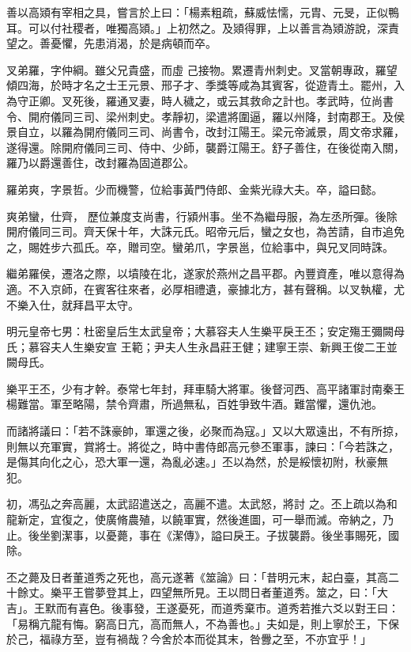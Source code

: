\begin{pinyinscope}
 善以高熲有宰相之具，嘗言於上曰：「楊素粗疏，蘇威怯懦，元胄、元旻，正似鴨耳。可以付社稷者，唯獨高熲。」上初然之。及熲得罪，上以善言為熲游說，深責望之。善憂懼，先患消渴，於是病頓而卒。



 叉弟羅，字仲綱。雖父兄貴盛，而虛
 己接物。累遷青州刺史。叉當朝專政，羅望傾四海，於時才名之士王元景、邢子才、季獎等咸為其賓客，從遊青土。罷州，入為守正卿。叉死後，羅通叉妻，時人穢之，或云其救命之計也。孝武時，位尚書令、開府儀同三司、梁州刺史。孝靜初，梁遣將圍逼，羅以州降，封南郡王。及侯景自立，以羅為開府儀同三司、尚書令，改封江陽王。梁元帝滅景，周文帝求羅，遂得還。除開府儀同三司、侍中、少師，襲爵江陽王。舒子善住，在後從南入關，羅乃以爵還善住，改封羅為固道郡公。



 羅弟爽，字景哲。少而機警，位給事黃門侍郎、金紫光祿大夫。卒，謚曰懿。



 爽弟蠻，仕齊，
 歷位兼度支尚書，行潁州事。坐不為繼母服，為左丞所彈。後除開府儀同三司。齊天保十年，大誅元氏。昭帝元后，蠻之女也，為苦請，自市追免之，賜姓步六孤氏。卒，贈司空。蠻弟爪，字景邕，位給事中，與兄叉同時誅。



 繼弟羅侯，遷洛之際，以墳陵在北，遂家於燕州之昌平郡。內豐資產，唯以意得為適。不入京師，在賓客往來者，必厚相禮遺，豪據北方，甚有聲稱。以叉執權，尤不樂入仕，就拜昌平太守。



 明元皇帝七男：杜密皇后生太武皇帝；大慕容夫人生樂平戾王丕；安定殤王彌闕母氏；慕容夫人生樂安宣
 王範；尹夫人生永昌莊王健；建寧王崇、新興王俊二王並闕母氏。



 樂平王丕，少有才幹。泰常七年封，拜車騎大將軍。後督河西、高平諸軍討南秦王楊難當。軍至略陽，禁令齊肅，所過無私，百姓爭致牛酒。難當懼，還仇池。



 而諸將議曰：「若不誅豪帥，軍還之後，必聚而為寇。」又以大眾遠出，不有所掠，則無以充軍實，賞將士。將從之，時中書侍郎高元參丕軍事，諫曰：「今若誅之，是傷其向化之心，恐大軍一還，為亂必速。」丕以為然，於是綏懷初附，秋豪無犯。



 初，馮弘之奔高麗，太武詔遣送之，高麗不遣。太武怒，將討
 之。丕上疏以為和龍新定，宜復之，使廣脩農殖，以饒軍實，然後進圖，可一舉而滅。帝納之，乃止。後坐劉潔事，以憂薨，事在《潔傳》，謚曰戾王。子拔襲爵。後坐事賜死，國除。



 丕之薨及日者董道秀之死也，高元遂著《筮論》曰：「昔明元末，起白臺，其高二十餘丈。樂平王嘗夢登其上，四望無所見。王以問日者董道秀。筮之，曰：「大吉」。王默而有喜色。後事發，王遂憂死，而道秀棄市。道秀若推六爻以對王曰：「易稱亢龍有悔。窮高日亢，高而無人，不為善也。」夫如是，則上寧於王，下保於己，福祿方至，豈有禍哉？今舍於本而從其末，咎釁之至，不亦宜乎！」




\end{pinyinscope}
